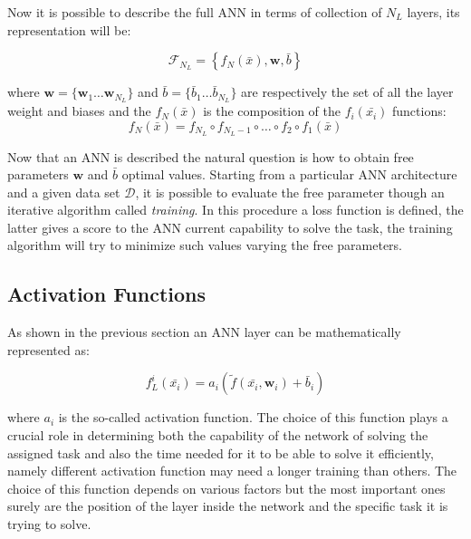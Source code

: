 \documentclass[../../main.tex]{subfiles}
\begin{document}
Now it is possible to describe the full ANN in terms of collection of $N_L$ layers, its representation will be:

\begin{equation}
    \mathcal{F}_{N_L} = \left\{ f_N(\bar{x}), \textbf{w}, \bar{b}\right\}
\end{equation}

where $\textbf{w} = \{\textbf{w}_1 \dots \textbf{w}_{N_L}\}$ and 
$ \bar{b} = \{ \bar{b}_1 \dots  \bar{b}_{N_L}\}$ are respectively the set of all the layer weight and biases and the $f_N(\bar{x})$ is the composition of the $f_i(\bar{x_i})$
functions:
\begin{equation}
    f_N(\bar{x}) = f_{N_L} \circ f_{N_L-1}\circ\dots\circ f_2\circ f_1 (\bar{x}) 
\end{equation}

Now that an ANN is described the natural question is how to obtain free parameters $\textbf{w}$ and $\bar{b}$ optimal values. Starting from a particular ANN architecture and a given data set $\mathcal{D}$, it is possible to evaluate the free parameter though an iterative algorithm called \textit{training}. In this procedure a loss function is defined, the latter gives a score to the ANN current capability to solve the task, the training algorithm will try to minimize such values varying the free parameters.  

\subsection{Activation Functions}
\label{sec:NN_act}

As shown in the previous section an ANN layer can be mathematically represented as:  

\begin{equation}
    f_L^i (\bar{x_i})=a_i \left( \tilde{f}(\bar{x_i}, \textbf{w}_i) + \bar{b}_i \right) 
    \label{eq:layer_math}
\end{equation}

where $a_i$ is the so-called activation function. The choice of this function plays a crucial role in determining both the capability of the network of solving the assigned task and also  the time needed for it to be able to solve it efficiently, namely different activation function may need a longer training than others. The choice of this function depends on various factors but the most important ones surely are the position of the layer inside the network and the specific task it is trying to solve.
\end{document}
